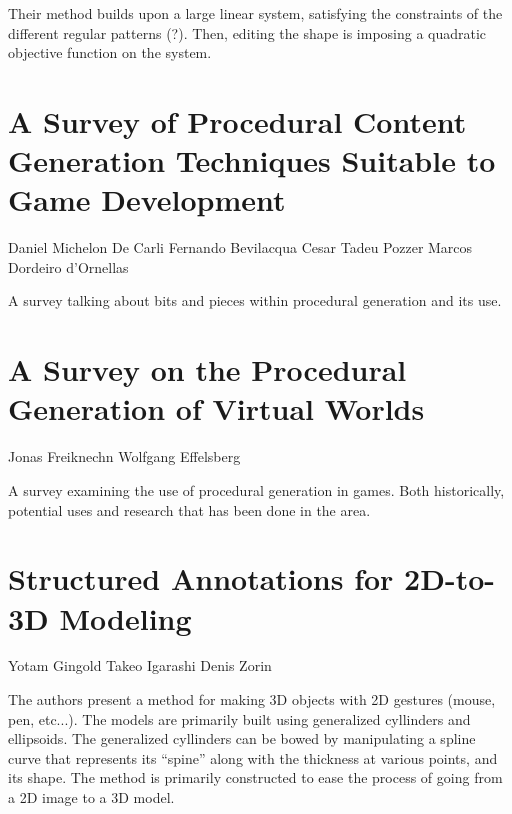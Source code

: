Their method builds upon a large linear system, satisfying the constraints of the different regular patterns (?). Then, editing the shape is imposing a quadratic objective function on the system. 


\section*{A Survey of Procedural Content Generation Techniques Suitable to Game Development}

Daniel Michelon De Carli
Fernando Bevilacqua
Cesar Tadeu Pozzer
Marcos Dordeiro d'Ornellas

A survey talking about bits and pieces within procedural generation and its use.


\section*{A Survey on the Procedural Generation of Virtual Worlds}

Jonas Freiknechn
Wolfgang Effelsberg

A survey examining the use of procedural generation in games. Both historically, potential uses and research that has been done in the area.


\section*{Structured Annotations for 2D-to-3D Modeling}

Yotam Gingold
Takeo Igarashi
Denis Zorin

The authors present a method for making 3D objects with 2D gestures (mouse, pen, etc...). The models are primarily built using generalized cyllinders and ellipsoids. The generalized cyllinders can be bowed by manipulating a spline curve that represents its ``spine'' along with the thickness at various points, and its shape. The method is primarily constructed to ease the process of going from a 2D image to a 3D model.
